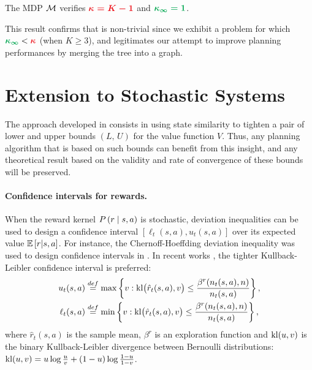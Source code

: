 \documentclass[runningheads]{llncs}
\begin{document}
\begin{proposition}
\label{prop:illustrative-example}
The MDP $\mathcal{M}$ verifies $\hlrb{\kappa = K-1}$ and $\hlgb{\kappa_\infty = 1}$.
\end{proposition}
This result confirms that  is non-trivial since we exhibit a problem for which $\hlgb{\kappa_\infty} < \hlrb{\kappa}$ (when $K\geq 3$), and legitimates our attempt to improve planning performances by merging the tree into a graph.


\section{Extension to Stochastic Systems}
\label{sec:stochastic}

The approach developed in  consists in using state similarity to tighten a pair of lower and upper bounds $(L,\,U)$ for the value function $V$. Thus, any planning algorithm that is based on such bounds can benefit from this insight, and any theoretical result based on the validity and rate of convergence of these bounds will be preserved.  

\paragraph{Confidence intervals for rewards.}

When the reward kernel $P\left(r \;\middle|\; s,a\right)$ is stochastic, deviation inequalities can be used to design a confidence interval $[\ell_t(s,a), u_t(s,a)]$ over its expected value $\operatorname*{\mathbb{E}}\left[r | s,a\right]$. For instance, the Chernoff-Hoeffding deviation inequality was used to design confidence intervals in \citep{Kocsis06UCT,Bubeck2010open,Kaufmann2017}.
In recent works \citep{Leurent2019practical, MDPGapE2020}, the tighter Kullback-Leibler confidence interval is preferred:
\begin{align*}
u_t(s,a) &\stackrel{def}{=} \max \left\{v : \operatorname{kl}\!\big(\hat{r}_t(s,a),v\big) \leq \frac {\beta^r(n_t(s,a), n)} {n_t(s,a)} \right\},\\
\ell_t(s,a) &\stackrel{def}{=}\min \left\{v : \operatorname{kl}\!\big(\hat{r}_t(s,a),v\big) \leq \frac {\beta^r(n_t(s,a), n)} {n_t(s,a)} \right\},
\end{align*}
where $\hat{r}_t(s,a)$ is the sample mean, $\beta^r$ is an exploration function and $\operatorname{kl}(u,v)$ is the binary Kullback-Leibler divergence between Bernoulli distributions: $\operatorname{kl}(u,v) = u \log \tfrac {u} {v} + (1-u) \log \tfrac {1-u} {1-v}$.
\end{document}
